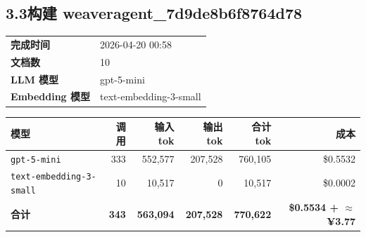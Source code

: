 \documentclass[11pt]{article}
\begin{document}
\subsection*{3.3\;构建 weaveragent\_7d9de8b6f8764d78}
\noindent\begin{minipage}{\textwidth}
\begin{tabular}{@{}ll@{}}
\textbf{完成时间} & 2026-04-20 00:58 \\
\textbf{文档数} & 10 \\
\textbf{LLM 模型} & gpt-5-mini \\
\textbf{Embedding 模型} & text-embedding-3-small \\
\end{tabular}
\end{minipage}
\par\vspace{0.25cm}
\noindent\begin{tabularx}{\textwidth}{@{}X r r r r r@{}}
\toprule
\rowcolor{headerbg!10}\textbf{模型} & \textbf{调用} & \textbf{输入 tok} & \textbf{输出 tok} & \textbf{合计 tok} & \textbf{成本} \\
\midrule
\rowcolor{rowalt}\texttt{\small gpt-5-mini} & 333 & 552{,}577 & 207{,}528 & 760{,}105 & \$0.5532 \\
\texttt{\small text-embedding-3-small} & 10 & 10{,}517 & 0 & 10{,}517 & \$0.0002 \\
\midrule
\rowcolor{headerbg!15}\textbf{合计} & \textbf{343} & \textbf{563{,}094} & \textbf{207{,}528} & \textbf{770{,}622} & \textbf{\$0.5534 + $\approx$ ¥3.77} \\
\bottomrule
\end{tabularx}
\vspace{0.5cm}
\end{document}
